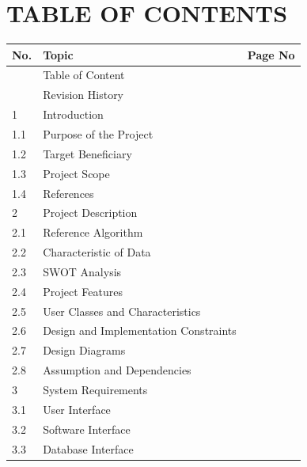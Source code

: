 \documentclass[12pt,a4paper]{article}
\begin{document}
\newpage

\section*{TABLE OF CONTENTS}

\begin{longtable}{|p{1.5cm}|p{8.5cm}|p{3cm}|}
    \hline
    \textbf{No.} & \textbf{Topic} & \textbf{Page No} \\
    \hline
    & Table of Content & \pageref{toc} \\
    \hline
    & Revision History & \pageref{revision} \\
    \hline
    1 & Introduction & \pageref{sec:intro} \\
    \hline
    1.1 & Purpose of the Project & \pageref{sec:purpose} \\
    \hline
    1.2 & Target Beneficiary & \pageref{sec:beneficiary} \\
    \hline
    1.3 & Project Scope & \pageref{sec:scope} \\
    \hline
    1.4 & References & \pageref{sec:references} \\
    \hline
    2 & Project Description & \pageref{sec:description} \\
    \hline
    2.1 & Reference Algorithm & \pageref{sec:algorithm} \\
    \hline
    2.2 & Characteristic of Data & \pageref{sec:data} \\
    \hline
    2.3 & SWOT Analysis & \pageref{sec:swot} \\
    \hline
    2.4 & Project Features & \pageref{sec:features} \\
    \hline
    2.5 & User Classes and Characteristics & \pageref{sec:users} \\
    \hline
    2.6 & Design and Implementation Constraints & \pageref{sec:constraints} \\
    \hline
    2.7 & Design Diagrams & \pageref{sec:diagrams} \\
    \hline
    2.8 & Assumption and Dependencies & \pageref{sec:assumptions} \\
    \hline
    3 & System Requirements & \pageref{sec:sysreq} \\
    \hline
    3.1 & User Interface & \pageref{sec:ui} \\
    \hline
    3.2 & Software Interface & \pageref{sec:softint} \\
    \hline
    3.3 & Database Interface & \pageref{sec:dbint} \\

\end{longtable}
\end{document}
